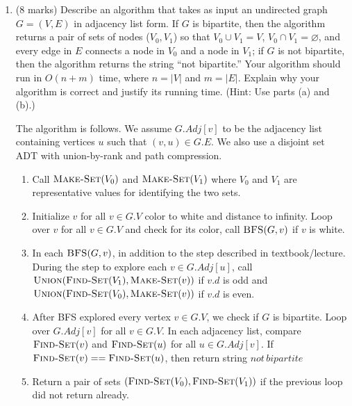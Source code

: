 \documentclass[11pt]{article}
\begin{document}
\begin{enumerate}[label=\alph*)]
\item (8 marks) Describe an algorithm that takes as input an undirected graph $G = (V, E)$ in adjacency
list form. If $G$ is bipartite, then the algorithm returns a pair of sets of nodes ($V_0, V_1$) so that $V_0 \cup V_1 = V$, $V_0 \cap V_1 = \varnothing$, and every edge in $E$ connects a node in $V_0$ and a node in $V_1$; if $G$ is not bipartite, then the algorithm returns the string “not bipartite.” Your algorithm should run in $O(n + m)$ time, where $n = |V|$ and $m = |E|$. Explain why your algorithm is correct and justify its running time. (Hint: Use parts (a) and (b).)

\begin{solution}
  The algorithm is follows. We assume $G.Adj[v]$ to be the adjacency list containing vertices $u$ such that $(v,u)\in G.E$. We also use a disjoint set ADT with union-by-rank and path compression.
  \begin{enumerate}
    \item Call $\textsc{Make-Set}(V_0)$ and $\textsc{Make-Set}(V_1)$ where $V_0$ and $V_1$ are representative values for identifying the two sets.
    \item Initialize $v$ for all $v\in G.V$ color to white and distance to infinity. Loop over $v$ for all $v \in G.V$ and check for its color, call $\textsc{BFS}(G,v)$ if $v$ is white.
    \item In each $\textsc{BFS}(G,v)$, in addition to the step described in textbook/lecture. During the step to explore each $v\in G.Adj[u]$, call $\textsc{Union}(\textsc{Find-Set}(V_1), \textsc{Make-Set}(v))$ if $v.d$ is odd and $\textsc{Union}(\textsc{Find-Set}(V_0), \textsc{Make-Set}(v))$ if $v.d$ is even.
    \item After BFS explored every vertex $v \in G.V$, we check if $G$ is bipartite. Loop over $G.Adj[v]$ for all $v \in G.V$. In each adjacency list, compare $\textsc{Find-Set}(v)$ and $\textsc{Find-Set}(u)$ for all $u\in G.Adj[v]$. If $\textsc{Find-Set}(v) == \textsc{Find-Set}(u)$, then return string $not\,bipartite$
    \item Return a pair of sets $(\textsc{Find-Set}(V_0), \textsc{Find-Set}(V_1))$ if the previous loop did not return already.
  \end{enumerate}

\end{solution}
\end{enumerate}
\end{document}
